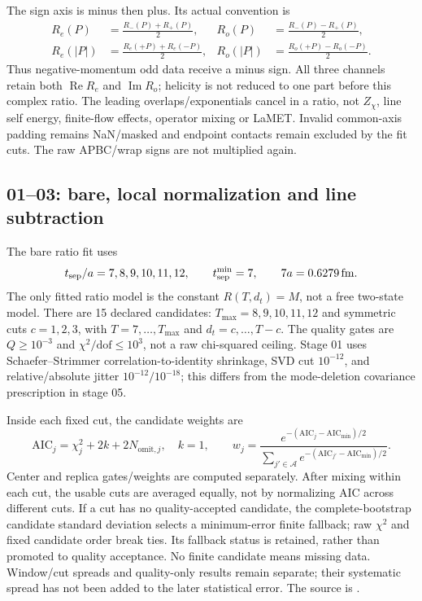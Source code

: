 \documentclass[11pt]{article}
\numberwithin{equation}{section}
\begin{document}
The sign axis is minus then plus.  Its actual convention is
\begin{align}
 R_e(P)&=\frac{R_-(P)+R_+(P)}2,&
 R_o(P)&=\frac{R_-(P)-R_+(P)}2,\\
 R_e(|P|)&=\frac{R_e(+P)+R_e(-P)}2,&
 R_o(|P|)&=\frac{R_o(+P)-R_o(-P)}2 .
\label{eq:l32x64-even-odd}
\end{align}
Thus negative-momentum odd data receive a minus sign.  All three channels
retain both \(\operatorname{Re}R_e\) and \(\operatorname{Im}R_o\);
helicity is not reduced to one part before this complex ratio.
The leading overlaps/exponentials cancel in a ratio, not \(Z_\chi\),
line self energy, finite-flow effects, operator mixing or LaMET.
Invalid common-axis padding remains NaN/masked and endpoint contacts
remain excluded by the fit cuts.  The raw APBC/wrap signs are not
multiplied again.

\subsection{01--03: bare, local normalization and line subtraction}

The bare ratio fit uses
\begin{equation}
 t_{\rm sep}/a=7,8,9,10,11,12,\qquad
 t_{\rm sep}^{\rm min}=7,\qquad 7a=0.6279\,\mathrm{fm}.
\label{eq:l32x64-tsep}
\end{equation}
The only fitted ratio model is the constant \(R(T,d_t)=M\), not a free
two-state model.  There are 15 declared candidates:
\(T_{\max}=8,9,10,11,12\) and symmetric cuts \(c=1,2,3\), with
\(T=7,\ldots,T_{\max}\) and \(d_t=c,\ldots,T-c\).  The quality gates are
\(Q\ge10^{-3}\) and \(\chi^2/\mathrm{dof}\le10^3\), not a raw chi-squared
ceiling.  Stage 01 uses Schaefer--Strimmer correlation-to-identity
shrinkage, SVD cut \(10^{-12}\), and relative/absolute jitter
\(10^{-12}/10^{-18}\); this differs from the mode-deletion covariance
prescription in stage 05.

Inside each fixed cut, the candidate weights are
\begin{equation}
 \mathrm{AIC}_j=\chi_j^2+2k+2N_{\mathrm{omit},j},\quad k=1,\qquad
 w_j=\frac{e^{-(\mathrm{AIC}_j-\mathrm{AIC}_{\min})/2}}
 {\sum_{j'\in\mathcal A}e^{-(\mathrm{AIC}_{j'}-\mathrm{AIC}_{\min})/2}}.
\label{eq:l32x64-bare-AIC}
\end{equation}
Center and replica gates/weights are computed separately.  After mixing
within each cut, the usable cuts are averaged equally, not by normalizing
AIC across different cuts.  If a cut has no quality-accepted candidate,
the complete-bootstrap candidate standard deviation selects a minimum-error
finite fallback; raw \(\chi^2\) and fixed candidate order break ties.
Its fallback status is retained, rather than promoted to quality acceptance.
No finite candidate means missing data.  Window/cut spreads and quality-only
results remain separate; their systematic spread has not been added to
the later statistical error.
The source is
.
\end{document}
